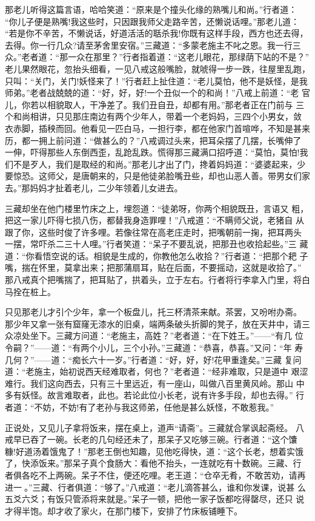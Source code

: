 那老儿听得这篇言语，哈哈笑道：“原来是个撞头化缘的熟嘴儿和尚。”行者道：
“你儿子便是熟嘴!我这些时，只因跟我师父走路辛苦，还懒说话哩。”那老儿道：
“若是你不辛苦，不懒说话，好道活活的聒杀我!你既有这样手段，西方也还去得，
去得。你一行几众?请至茅舍里安宿。”三藏道：“多蒙老施主不叱之恩。我一行三
众。”老者道：“那一众在那里？”行者指着道：“这老儿眼花，那绿荫下站的不是？”
老儿果然眼花，忽抬头细看，一见八戒这般嘴脸，就唬得一步一跌，往屋里乱跑，
只叫：“关门，关门!妖怪来了！”行者赶上扯住道：“老儿莫怕，他不是妖怪，是我
师弟。”老者战兢兢的道：“好，好，好!一个丑似一个的和尚！”八戒上前道：“老
官儿，你若以相貌取人，干净差了。我们丑自丑，却都有用。”那老者正在门前与
三个和尚相讲，只见那庄南边有两个少年人，带着一个老妈妈，三四个小男女，敛
衣赤脚，插秧而回。他看见一匹白马，一担行李，都在他家门首喧哗，不知是甚来
历，都一拥上前问道：“做甚么的？”八戒调过头来，把耳朵摆了几摆，长嘴伸了
一伸，吓得那些人东倒西歪，乱跄乱跌。慌得那三藏满口招呼道：“莫怕，莫怕!我
们不是歹人，我们是取经的和尚。”那老儿才出了门，搀着妈妈道：“婆婆起来，少
要惊恐。这师父，是唐朝来的，只是他徒弟脸嘴丑些，却也山恶人善。带男女们家
去。”那妈妈才扯着老儿，二少年领着儿女进去。

三藏却坐在他门楼里竹床之上，埋怨道：“徒弟呀，你两个相貌既丑，言语又
粗，把这一家儿吓得七损八伤，都替我身造罪哩！”八戒道：“不瞒师父说，老猪自
从跟了你，这些时俊了许多哩。若像往常在高老庄走时，把嘴朝前一掬，把耳两头
一摆，常吓杀二三十人哩。”行者笑道：“呆子不要乱说，把那丑也收拾起些。”三
藏道：“你看悟空说的话。相貌是生成的，你教他怎么收拾？”行者道：“把那个耙
子嘴，揣在怀里，莫拿出来；把那蒲扇耳，贴在后面，不要摇动，这就是收拾了。”
那八戒真个把嘴揣了，把耳贴了，拱着头，立于左右。行者将行李拿入门里，将白
马拴在桩上。

只见那老儿才引个少年，拿一个板盘儿，托三杯清茶来献。茶罢，又吩咐办斋。
那少年又拿一张有窟窿无漆水的旧桌，端两条破头折脚的凳子，放在天井中，请三
众凉处坐下。三藏方问道：“老施主，高姓？”老者道：“在下姓王。”——“有几
位令嗣？”——道：“有两个小儿，三个小孙。”三藏道：“恭喜，恭喜。”又问：“年
寿几何？”——道：“痴长六十一岁。”行者道：“好，好，好!花甲重逢矣。”三藏
复问道：“老施主，始初说西天经难取者，何也？”老者道：“经非难取，只是道中
艰涩难行。我们这向西去，只有三十里远近，有一座山，叫做八百里黄风岭。那山
中多有妖怪。故言难取者，此也。若论此位小长老，说有许多手段，却也去得。”
行者道：“不妨，不妨!有了老孙与我这师弟，任他是甚么妖怪，不敢惹我。”

正说处，又见儿子拿将饭来，摆在桌上，道声“请斋”。三藏就合掌讽起斋经。
八戒早已吞了一碗。长老的几句经还未了，那呆子又吃够三碗。行者道：“这个馕
糠!好道汤着饿鬼了！”那老王倒也知趣，见他吃得快，道：“这个长老，想着实饿
了，快添饭来。”那呆子真个食肠大：看他不抬头，一连就吃有十数碗。三藏、行
者俱各吃不上两碗。呆子不住，便还吃哩。老王道：“仓卒无肴，不敢苦劝，请再
进一。”三藏、行者俱道：“够了。”八戒道：“老儿滴答甚么，谁和你发课，说甚
么五爻六爻；有饭只管添将来就是。”呆子一顿，把他一家子饭都吃得罄尽，还只
说才得半饱。却才收了家火，在那门楼下，安排了竹床板铺睡下。

